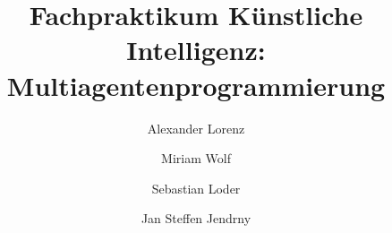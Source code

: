 \documentclass[runningheads]{llncs}
\begin{document}
%
\title{Fachpraktikum Künstliche Intelligenz: Multiagentenprogrammierung}
%
%
\author{Alexander Lorenz \and
Miriam Wolf \and
Sebastian Loder \and
Jan Steffen Jendrny}
%
%
%
\maketitle              %
%
%
%
%
%









%
%
%
%
% 
% 
%

\end{document}
